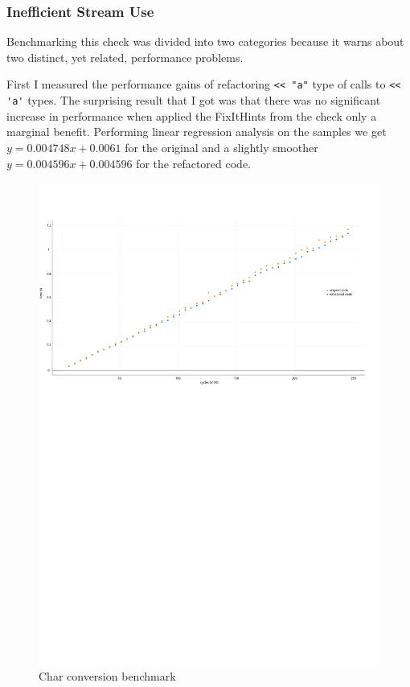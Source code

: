 \subsubsection{Inefficient Stream Use}
\par Benchmarking this check was divided into two categories because it warns about two distinct, yet related, performance problems. \medskip 
\par First I measured the performance gains of refactoring \verb|<< "a"| type of calls to \verb|<< 'a'| types. The surprising result that I got was that there was no significant increase in performance when applied the FixItHints from the check only a marginal benefit. Performing linear regression analysis on the samples we get $y=0.004748x+0.0061$ for the original and a slightly smoother $y=0.004596x+0.004596$ for the refactored code.
\begin{figure}[H]
	\caption{Char conversion benchmark}
	\includegraphics[scale=0.7]{images/stream_char_performance.pdf}
\end{figure}
